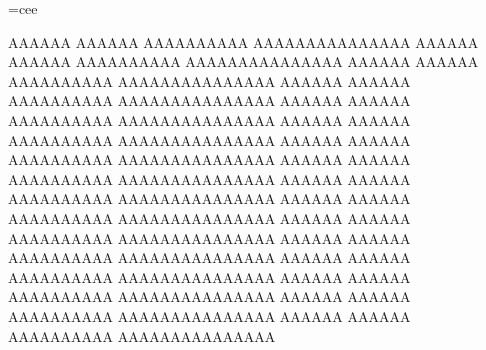 \documentclass{article}
\begin{document}
\font\myfont=cee

{\myfont
AAAAAA AAAAAA AAAAAAAAAA AAAAAAAAAAAAAAA
AAAAAA AAAAAA AAAAAAAAAA AAAAAAAAAAAAAAA
AAAAAA AAAAAA AAAAAAAAAA AAAAAAAAAAAAAAA
AAAAAA AAAAAA AAAAAAAAAA AAAAAAAAAAAAAAA
AAAAAA AAAAAA AAAAAAAAAA AAAAAAAAAAAAAAA
AAAAAA AAAAAA AAAAAAAAAA AAAAAAAAAAAAAAA
AAAAAA AAAAAA AAAAAAAAAA AAAAAAAAAAAAAAA
AAAAAA AAAAAA AAAAAAAAAA AAAAAAAAAAAAAAA
AAAAAA AAAAAA AAAAAAAAAA AAAAAAAAAAAAAAA
AAAAAA AAAAAA AAAAAAAAAA AAAAAAAAAAAAAAA
AAAAAA AAAAAA AAAAAAAAAA AAAAAAAAAAAAAAA
AAAAAA AAAAAA AAAAAAAAAA AAAAAAAAAAAAAAA
AAAAAA AAAAAA AAAAAAAAAA AAAAAAAAAAAAAAA
AAAAAA AAAAAA AAAAAAAAAA AAAAAAAAAAAAAAA
AAAAAA AAAAAA AAAAAAAAAA AAAAAAAAAAAAAAA
AAAAAA AAAAAA AAAAAAAAAA AAAAAAAAAAAAAAA
}
\end{document}
